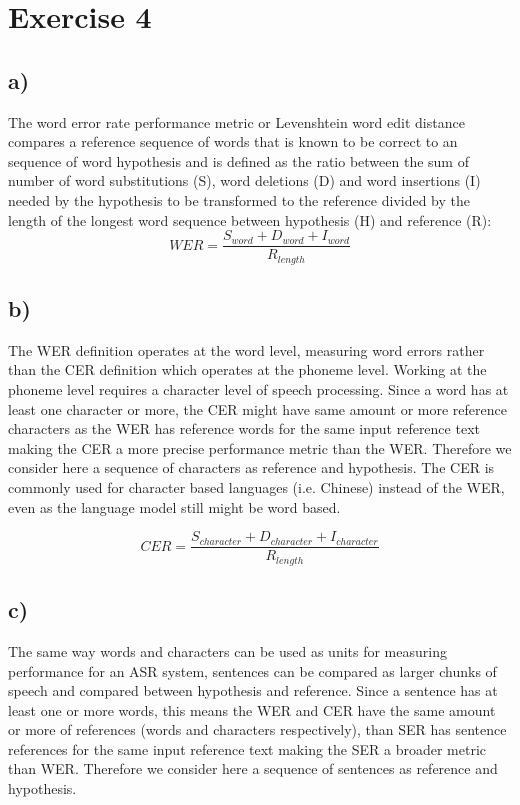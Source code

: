 \section*{Exercise 4} %
\label{sec:section_name}

\subsection*{a)} %
\label{sub:a}	

The word error rate performance metric or Levenshtein word edit distance compares a reference sequence of words that is known to be 
correct to an sequence of word hypothesis and is defined as the ratio between the sum of number of word substitutions (S), word 
deletions (D) and 
word insertions (I) needed by the hypothesis to be transformed to the reference divided by the length of the longest word sequence 
between hypothesis (H) and reference (R):
\[
	WER = \frac{S_{word} + D_{word} + I_{word}}{R_{length}}
\]


\subsection*{b)} %
\label{sub:b}

The WER definition operates at the word level, measuring word errors rather than the CER definition which operates at the phoneme 
level. Working at the phoneme level requires a character level of speech processing. Since a word has at least one character or 
more, the CER might have same amount or more reference characters as the WER has reference words for the same input reference text 
making the CER a more precise performance metric than the WER. Therefore we consider here a sequence of characters as reference and 
hypothesis.
The CER is commonly used for character based languages (i.e. Chinese) instead of the WER, even as the language model still might be 
word based. 

\[
	CER = \frac{S_{character} + D_{character} + I_{character}}{R_{length}}
\]



\subsection*{c)} %
\label{sub:c}


The same way words and characters can be used as units for measuring performance for an ASR system, sentences can be compared as 
larger chunks of speech and compared between hypothesis and reference. Since a sentence has at least one or more words, this means 
the WER and CER have the same amount or more of references (words and characters respectively), than SER has sentence references for 
the same input reference text making the SER a broader metric than WER. Therefore we consider here a sequence of sentences as 
reference and 
hypothesis.

